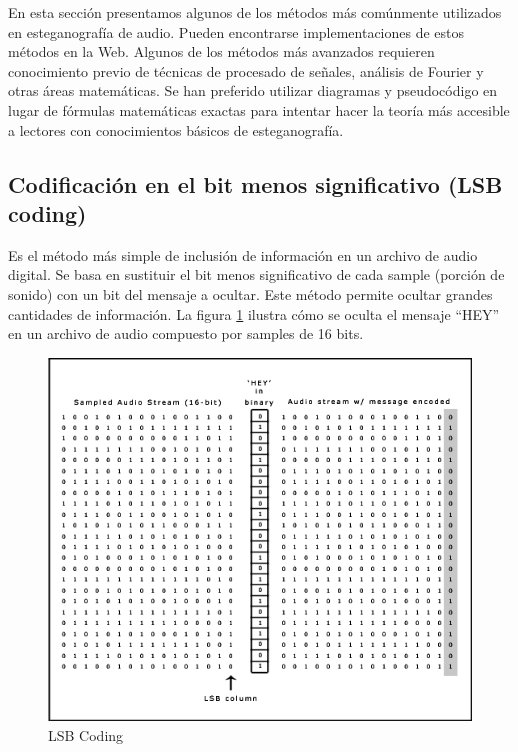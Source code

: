 \documentclass[12pt]{article}
\begin{document}
En esta sección presentamos algunos de los métodos más comúnmente utilizados en esteganografía de audio. Pueden encontrarse implementaciones de estos métodos en la Web. Algunos de los métodos más avanzados requieren conocimiento previo de técnicas de procesado de señales, análisis de Fourier y otras áreas matemáticas. Se han preferido utilizar diagramas y pseudocódigo en lugar de fórmulas matemáticas exactas para intentar hacer la teoría más accesible a lectores con conocimientos básicos de esteganografía.

\subsection{Codificación en el bit menos significativo (LSB coding)}

Es el método más simple de inclusión de información en un archivo de audio digital. Se basa en sustituir el bit menos significativo de cada sample (porción de sonido) con un bit del mensaje a ocultar. Este método permite ocultar grandes cantidades de información. La figura \ref{lsbcoding} ilustra cómo se oculta el mensaje ``HEY'' en un archivo de audio compuesto por samples de 16 bits.

\begin{figure}
  \centering
    \includegraphics[width=\textwidth]{img/lsbimage}
  \caption{LSB Coding}
  \label{lsbcoding}
\end{figure}
\end{document}
